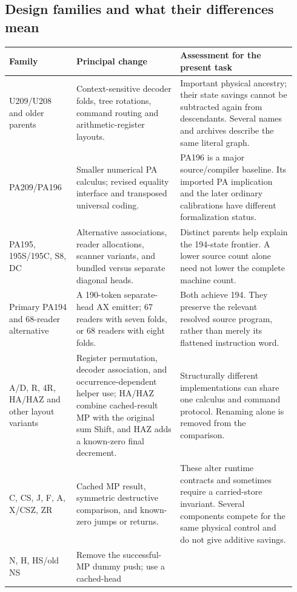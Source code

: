 \documentclass[11pt,letterpaper]{article}
\begin{document}
\subsection{Design families and what their differences mean}

\begin{longtable}{@{}>{\raggedright\arraybackslash}p{0.22\linewidth}>{\raggedright\arraybackslash}p{0.34\linewidth}>{\raggedright\arraybackslash}p{0.38\linewidth}@{}}
\toprule Family & Principal change & Assessment for the present task\\
\midrule\endhead
U209/U208 and older parents & Context-sensitive decoder folds, tree rotations,
command routing and arithmetic-register layouts. & Important physical ancestry;
their state savings cannot be subtracted again from descendants. Several names
and archives describe the same literal graph.\\
PA209/PA196 & Smaller numerical PA calculus; revised equality interface and
transposed universal coding. & PA196 is a major source/compiler baseline.
Its imported PA implication and the later ordinary calibrations have different
formalization status.\\
PA195, 195S/195C, S8, DC & Alternative associations, reader allocations,
scanner variants, and bundled versus separate diagonal heads. & Distinct parents
help explain the 194-state frontier. A lower source count alone need not lower
the complete machine count.\\
Primary PA194 and 68-reader alternative & A 190-token separate-head AX emitter;
67 readers with seven folds, or 68 readers with eight folds. & Both achieve
194. They preserve the relevant resolved source program, rather than merely
its flattened instruction word.\\
A/D, R, 4R, HA/HAZ and other layout variants & Register permutation, decoder association,
and occurrence-dependent helper use; HA/HAZ combine cached-result MP with the
original sum Shift, and HAZ adds a known-zero final decrement. & Structurally different implementations
can share one calculus and command protocol. Renaming alone is removed from
the comparison.\\
C, CS, J, F, A, X/CSZ, ZR & Cached MP result, symmetric destructive comparison,
and known-zero jumps or returns. & These alter runtime contracts and sometimes
require a carried-store invariant. Several components compete for the same
physical control and do not give additive savings.\\
N, H, HS/old NS & Remove the successful-MP dummy push; use a cached-head

\end{longtable}
\end{document}
